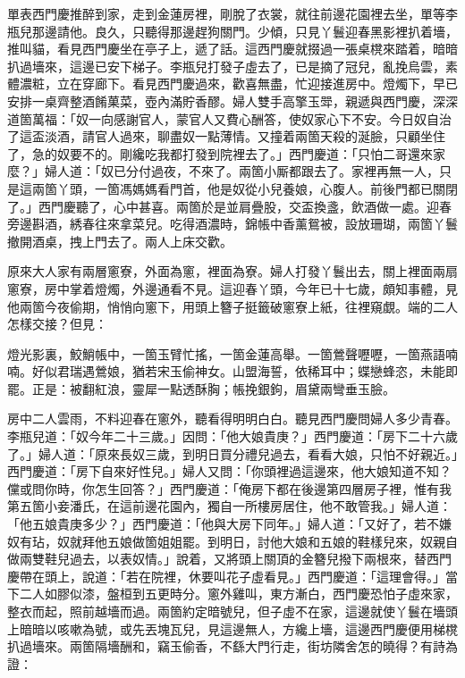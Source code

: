單表西門慶推醉到家，走到金蓮房裡，剛脫了衣裳，就往前邊花園裡去坐，單等李瓶兒那邊請他。良久，只聽得那邊趕狗關門。{}少傾，只見丫鬟迎春黑影裡扒着墻，推叫貓，{}看見西門慶坐在亭子上，遞了話。這西門慶就掇過一張桌櫈來踏着，暗暗扒過墻來，這邊已安下梯子。李瓶兒打發子虛去了，已是摘了冠兒，亂挽烏雲，素體濃粧，立在穿廊下。{}看見西門慶過來，歡喜無盡，忙迎接進房中。燈燭下，早已安排一桌齊整酒餚菓菜，壺內滿貯香醪。婦人雙手高擎玉斝，親遞與西門慶，深深道箇萬福：「奴一向感謝官人，蒙官人又費心酬答，使奴家心下不安。今日奴自治了這盃淡酒，請官人過來，聊盡奴一點薄情。{}又撞着兩箇天殺的涎臉，只顧坐住了，急的奴要不的。剛纔吃我都打發到院裡去了。」西門慶道：「只怕二哥還來家麼？」婦人道：「奴已分付過夜，不來了。兩箇小厮都跟去了。家裡再無一人，只是這兩箇丫頭，一箇馮媽媽看門首，他是奴從小兒養娘，心腹人。前後門都已關閉了。」西門慶聽了，心中甚喜。兩箇於是並肩疊股，交盃換盞，飲酒做一處。迎春旁邊斟酒，綉春往來拿菜兒。吃得酒濃時，錦帳中香薰鴛被，設放珊瑚，兩箇丫鬟撤開酒桌，拽上門去了。兩人上床交歡。

原來大人家有兩層窻寮，外面為窻，裡面為寮。婦人打發丫鬟出去，關上裡面兩扇窻寮，房中掌着燈燭，外邊通看不見。這迎春丫頭，今年已十七歲，頗知事體，見他兩箇今夜偷期，悄悄向窻下，用頭上簪子挺籤破窻寮上紙，往裡窺覷。端的二人怎樣交接？但見：

\begin{myquote}
燈光影裏，鮫鮹帳中，一箇玉臂忙搖，一箇金蓮高舉。一箇鶯聲嚦嚦，一箇燕語喃喃。好似君瑞遇鶯娘，猶若宋玉偷神女。山盟海誓，依稀耳中；蝶戀蜂恣，未能即罷。正是：被翻紅浪，靈犀一點透酥胸；帳挽銀鉤，眉黛兩彎垂玉臉。
\end{myquote}

房中二人雲雨，不料迎春在窻外，聽看得明明白白。聽見西門慶問婦人多少青春。李瓶兒道：「奴今年二十三歲。」因問：「他大娘貴庚？」西門慶道：「房下二十六歲了。」婦人道：「原來長奴三歲，到明日買分禮兒過去，看看大娘，只怕不好親近。」{}西門慶道：「房下自來好性兒。」婦人又問：「你頭裡過這邊來，他大娘知道不知？儻或問你時，你怎生回答？」西門慶道：「俺房下都在後邊第四層房子裡，惟有我第五箇小妾潘氏，在這前邊花園內，獨自一所樓房居住，他不敢管我。」婦人道：「他五娘貴庚多少？」西門慶道：「他與大房下同年。」婦人道：「又好了，若不嫌奴有玷，奴就拜他五娘做箇姐姐罷。到明日，討他大娘和五娘的鞋樣兒來，奴親自做兩雙鞋兒過去，以表奴情。」說着，又將頭上關頂的金簪兒撥下兩根來，替西門慶帶在頭上，說道：「若在院裡，休要叫花子虛看見。」西門慶道：「這理會得。」當下二人如膠似漆，盤桓到五更時分。窻外雞叫，東方漸白，西門慶恐怕子虛來家，整衣而起，照前越墻而過。兩箇約定暗號兒，但子虛不在家，這邊就使丫鬟在墻頭上暗暗以咳嗽為號，或先丟塊瓦兒，見這邊無人，方纔上墻，這邊西門慶便用梯櫈扒過墻來。兩箇隔墻酬和，竊玉偷香，不繇大門行走，街坊隣舍怎的曉得？有詩為證：

